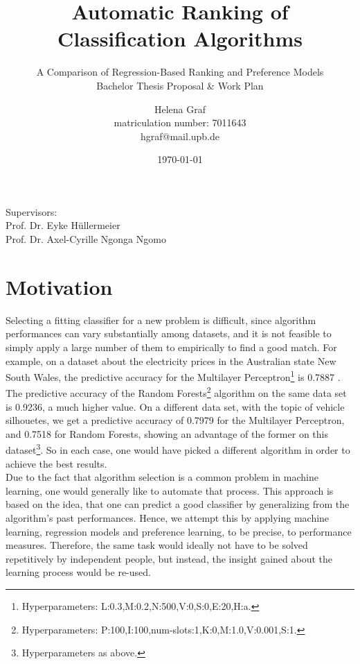 \documentclass[12pt]{scrartcl}
\begin{document}
\title{Automatic Ranking of Classification Algorithms}
\subtitle{A Comparison of Regression-Based Ranking and Preference Models
\\\vspace{2em}Bachelor Thesis Proposal \& Work Plan}

\author{Helena Graf\\ 
\small{matriculation number: 7011643}\\ 
\small{hgraf@mail.upb.de}}
\date{\today}

\maketitle
\vspace{2em}

\begin{center}
\small{Supervisors:}\\
\large{Prof. Dr. Eyke H\"ullermeier}\\
\large{Prof. Dr. Axel-Cyrille Ngonga Ngomo}
\end{center}

\newpage
\tableofcontents
\newpage

\section{Motivation}\label{sec:motivation}
Selecting a fitting classifier for a new problem is difficult, since algorithm performances can vary substantially among datasets, and it is not feasible to simply apply a large number of them to empirically to find a good match. For example, on a dataset about the electricity prices in the Australian state New South Wales, %
 the predictive accuracy for the Multilayer Perceptron\footnote{Hyperparameters: L:0.3,M:0.2,N:500,V:0,S:0,E:20,H:a.} is 0.7887 %
. The predictive accuracy of the Random Forests\footnote{Hyperparameters: P:100,I:100,num-slots:1,K:0,M:1.0,V:0.001,S:1.} algorithm on the same data set is 0.9236, a much higher value. %
On a different data set, with the topic of vehicle silhouetes, %
 we get a predictive accuracy of 0.7979 %
 for the Multilayer Perceptron, and 0.7518 %
 for Random Forests, showing an advantage of the former on this dataset\footnote{Hyperparameters as above.}. So in each case, one would have picked a different algorithm in order to achieve the best results.
\\

Due to the fact that algorithm selection is a common problem in machine learning, one would generally like to automate that process. This approach is based on the idea, that one can predict a good classifier by generalizing from the algorithm's past performances. Hence, we attempt this by applying machine learning, regression models and preference learning, to be precise, to performance measures. Therefore, the same task would ideally not have to be solved repetitively by independent people, but instead, the insight gained about the learning process would be re-used.\\
\end{document}
